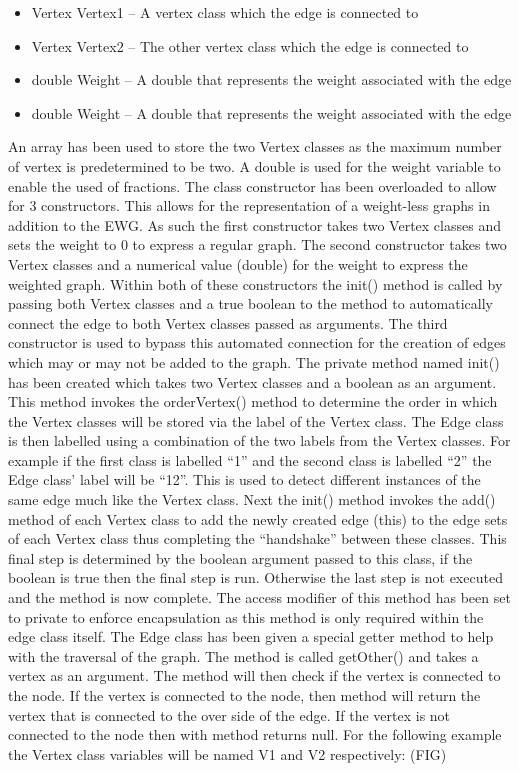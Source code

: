 \documentclass{AISB2008}
\begin{document}
{\begin{itemize}
\item Vertex Vertex1 – A vertex class which the edge is connected to
\item Vertex Vertex2 – The other vertex class which the edge is connected to
\item double Weight – A double that represents the weight associated with the edge
\item double Weight – A double that represents the weight associated with the edge
\end{itemize}

An array has been used to store the two Vertex classes as the maximum number of vertex is predetermined to be two. A double is used for the weight variable to enable the used of fractions. 
The class constructor has been overloaded to allow for 3 constructors. This allows for the representation of a weight-less graphs in addition to the EWG. As such the first constructor takes two Vertex classes and sets the weight to 0 to express a regular graph. The second constructor takes two Vertex classes and a numerical value (double) for the weight to express the weighted graph. Within both of these constructors the init()  method is called by passing both Vertex classes and a true boolean to the method to automatically connect the edge to both Vertex classes passed as arguments. The third constructor is used to bypass this automated connection for the creation of edges which may or may not be added to the graph.
The private method named init() has been created which takes two Vertex classes and a boolean as an argument. This method invokes the orderVertex() method to determine the order in which the Vertex classes will be stored via the label of the Vertex class. The Edge class is then labelled using a combination of the two labels from the Vertex classes. For example if the first class is labelled “1” and the second class is labelled “2” the Edge class’ label will be “12”. This is used to detect different instances of the same edge much like the Vertex class. Next the init() method invokes the add() method of each Vertex class to add the newly created edge (this) to the edge sets of each Vertex class thus completing the “handshake” between these classes. This final step is determined by the boolean argument passed to this class, if the boolean is true then the final step is run. Otherwise the last step is not executed and the method is now complete. The access modifier of this method has been set to private to enforce encapsulation as this method is only required within the edge class itself.
The Edge class has been given a special getter method to help with the traversal of the graph. The method is called getOther() and takes a vertex as an argument. The method will then check if the vertex is connected to the node. If the vertex is connected to the node, then method will return the vertex that is connected to the over side of the edge. If the vertex is not connected to the node then with method returns null.
For the following example the Vertex class variables will be named V1 and V2 respectively:
(FIG)

}
\end{document}
